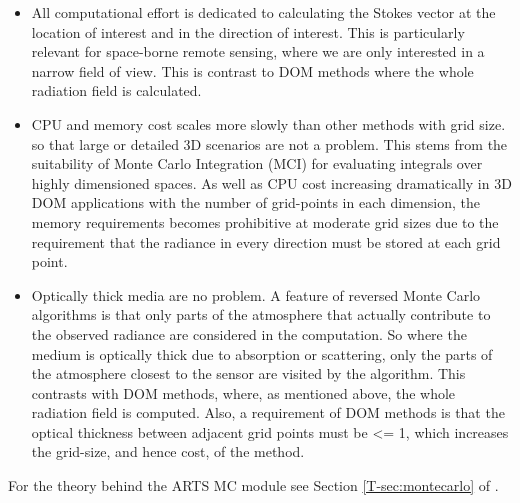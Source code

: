 \begin{itemize}
\item All computational effort is dedicated to calculating the Stokes vector at
  the location of interest and in the direction of interest. This is
  particularly relevant for space-borne remote sensing, where we are only
  interested in a narrow field of view. This is contrast to DOM methods where
  the whole radiation field is calculated.
\item CPU and memory cost scales more slowly than other methods with grid size.
  so that large or detailed 3D scenarios are not a problem. This stems from the
  suitability of Monte Carlo Integration (MCI) for evaluating integrals over
  highly dimensioned spaces. As well as CPU cost increasing dramatically in 3D
  DOM applications with the number of grid-points in each dimension, the memory
  requirements becomes prohibitive at moderate grid sizes due to the
  requirement that the radiance in every direction must be stored at each grid
  point.
\item Optically thick media are no problem. A feature of reversed Monte Carlo
  algorithms is that only parts of the atmosphere that actually contribute to
  the observed radiance are considered in the computation. So where the medium
  is optically thick due to absorption or scattering, only the parts of the
  atmosphere closest to the sensor are visited by the algorithm. This contrasts
  with DOM methods, where, as mentioned above, the whole radiation field is
  computed. Also, a requirement of DOM methods is that the optical thickness
  between adjacent grid points must be <= 1, which increases the grid-size, and
  hence cost, of the method.
\end{itemize}

For the theory behind the ARTS MC module see Section \ref{T-sec:montecarlo} of
\theory.





